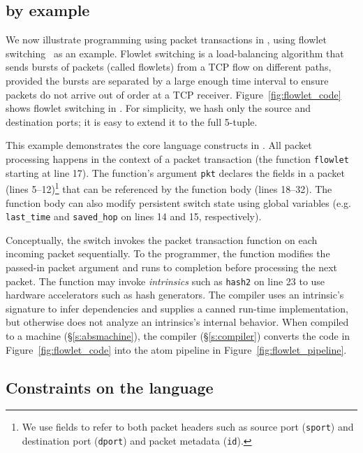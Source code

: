 \subsection{\pktlanguage by example}
\label{ss:flowlet}

We now illustrate programming using packet transactions in \pktlanguage, using
flowlet switching~\cite{flowlets} as an example. Flowlet switching is a
load-balancing algorithm that sends bursts of packets (called flowlets) from a
TCP flow on different paths, provided the bursts are separated by a large
enough time interval to ensure packets do not arrive out of order at a TCP
receiver. Figure~\ref{fig:flowlet_code} shows flowlet switching in
\pktlanguage. For simplicity, we hash only the source and destination ports; it
is easy to extend it to the full 5-tuple.

This example demonstrates the core language constructs in \pktlanguage. All
packet processing happens in the context of a packet transaction (the function
\texttt{flowlet} starting at line 17). The function's argument {\tt pkt}
declares the fields in a packet (lines 5--12)\footnote{We use fields to refer
to both packet headers such as source port ({\tt sport}) and destination port
({\tt dport}) and packet metadata ({\tt id}).} that can be referenced by the
function body (lines 18--32).  The function body can also modify persistent
switch state using global variables (e.g.  \texttt{last\_time} and
\texttt{saved\_hop} on lines 14 and 15, respectively).

Conceptually, the switch invokes the packet transaction function on each
incoming packet sequentially. To the programmer, the function modifies the
passed-in packet argument and runs to completion before processing the next
packet.  The function may invoke \textit{intrinsics} such as \texttt{hash2} on
line 23 to use hardware accelerators such as hash generators.  The \pktlanguage
compiler uses an intrinsic's signature to infer dependencies and supplies a
canned run-time implementation, but otherwise does not analyze an intrinsics's
internal behavior. When compiled to a \absmachine machine
(\S\ref{s:absmachine}), the \pktlanguage compiler (\S\ref{s:compiler}) converts
the code in Figure~\ref{fig:flowlet_code} into the atom pipeline in
Figure~\ref{fig:flowlet_pipeline}.

\subsection{Constraints on the language}
\label{ss:constraints}

